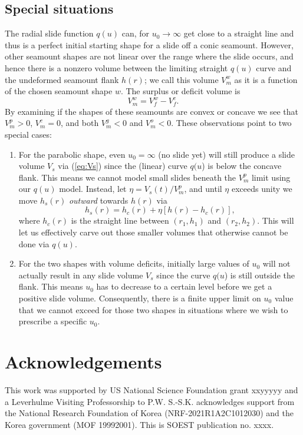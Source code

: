 \subsection{Special situations}

The radial slide function $q(u)$ can, for $u_0 \rightarrow \infty$ get close to a straight line
and thus is a perfect initial starting shape for a slide off a conic seamount.  However, other
seamount shapes are not linear over the range where the slide occurs, and hence there is a nonzero
volume between the limiting straight $q(u)$ curve and the undeformed seamount flank $h(r)$;
we call this volume $V_m^w$ as it is a function of the chosen seamount shape $w$. The
surplus or deficit volume is
\begin{equation*}
V_m^w = V_f^w - V_f^c.
\end{equation*}
By examining if the shapes of these seamounts are convex or concave we see that $V_m^p > 0$, $V_m^c = 0$,
and both $V_m^g < 0$ and $V_m^o < 0$. These observations point to two special cases:

\begin{enumerate}
  \item For the parabolic shape, even $u_0 = \infty$ (no slide yet) will still produce a slide volume
  $V_s$ via (\ref{eq:Vs}) since the (linear) curve $q(u$) is below the concave flank.  This means we
  cannot model small slides beneath the $V_m^p$ limit using our $q(u)$ model. Instead, let
  $\eta = V_s(t)/V_m^p$, and until $\eta$ exceeds unity we move $h_s(r)$ \emph{outward} towards $h(r)$ via
  \begin{equation*}
  h_s(r) = h_c(r) + \eta \left [h(r) - h_c(r) \right ],
  \end{equation*}
  where $h_c(r)$ is the straight line between $(r_1, h_1)$ and $(r_2, h_2)$.  This will let us effectively
  carve out those smaller volumes that otherwise cannot be done via $q(u)$.
  \item For the two shapes with volume deficits, initially large values of $u_0$ will not actually
  result in any slide volume $V_s$ since the curve $q(u$) is still outside the flank. This means $u_0$
  has to decrease to a certain level before we get a positive slide volume. Consequently, there is a
  finite upper limit on $u_0$ value that we cannot exceed for those two shapes in situations where
  we wish to prescribe a specific $u_0$.
\end{enumerate}

\section{Acknowledgements}
This work was supported by US National Science Foundation grant xxyyyyy and a Leverhulme Visiting
Professorship to P.W. S.-S.K. acknowledges support from the National Research Foundation of Korea
(NRF-2021R1A2C1012030) and the Korea government (MOF 19992001).
This is SOEST publication no. xxxx.
